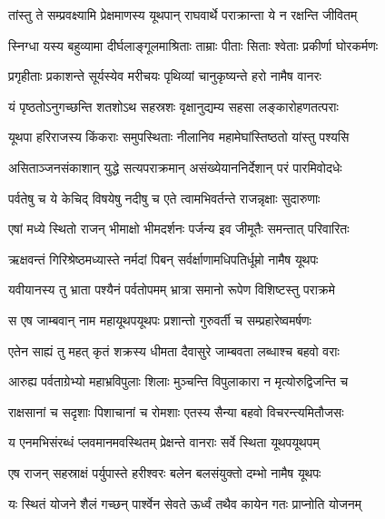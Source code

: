 
\twolineshloka
{तांस्तु ते सम्प्रवक्ष्यामि प्रेक्षमाणस्य यूथपान्}
{राघवार्थे पराक्रान्ता ये न रक्षन्ति जीवितम्} %

\twolineshloka
{स्निग्धा यस्य बहुव्यामा दीर्घलाङ्गूलमाश्रिताः}
{ताम्राः पीताः सिताः श्वेताः प्रकीर्णा घोरकर्मणः} %

\twolineshloka
{प्रगृहीताः प्रकाशन्ते सूर्यस्येव मरीचयः}
{पृथिव्यां चानुकृष्यन्ते हरो नामैष वानरः} %

\twolineshloka
{यं पृष्ठतोऽनुगच्छन्ति शतशोऽथ सहस्रशः}
{वृक्षानुद्यम्य सहसा लङ्कारोहणतत्पराः} %

\twolineshloka
{यूथपा हरिराजस्य किंकराः समुपस्थिताः}
{नीलानिव महामेघांस्तिष्ठतो यांस्तु पश्यसि} %

\twolineshloka
{असिताञ्जनसंकाशान् युद्धे सत्यपराक्रमान्}
{असंख्येयाननिर्देशान् परं पारमिवोदधेः} %

\twolineshloka
{पर्वतेषु च ये केचिद् विषयेषु नदीषु च}
{एते त्वामभिवर्तन्ते राजन्नृक्षाः सुदारुणाः} %

\twolineshloka
{एषां मध्ये स्थितो राजन् भीमाक्षो भीमदर्शनः}
{पर्जन्य इव जीमूतैः समन्तात् परिवारितः} %

\twolineshloka
{ऋक्षवन्तं गिरिश्रेष्ठमध्यास्ते नर्मदां पिबन्}
{सर्वर्क्षाणामधिपतिर्धूम्रो नामैष यूथपः} %

\twolineshloka
{यवीयानस्य तु भ्राता पश्यैनं पर्वतोपमम्}
{भ्रात्रा समानो रूपेण विशिष्टस्तु पराक्रमे} %

\twolineshloka
{स एष जाम्बवान् नाम महायूथपयूथपः}
{प्रशान्तो गुरुवर्ती च सम्प्रहारेष्वमर्षणः} %

\twolineshloka
{एतेन साह्यं तु महत् कृतं शक्रस्य धीमता}
{दैवासुरे जाम्बवता लब्धाश्च बहवो वराः} %

\twolineshloka
{आरुह्य पर्वताग्रेभ्यो महाभ्रविपुलाः शिलाः}
{मुञ्चन्ति विपुलाकारा न मृत्योरुद्विजन्ति च} %

\twolineshloka
{राक्षसानां च सदृशाः पिशाचानां च रोमशाः}
{एतस्य सैन्या बहवो विचरन्त्यमितौजसः} %

\twolineshloka
{य एनमभिसंरब्धं प्लवमानमवस्थितम्}
{प्रेक्षन्ते वानराः सर्वे स्थिता यूथपयूथपम्} %

\twolineshloka
{एष राजन् सहस्राक्षं पर्युपास्ते हरीश्वरः}
{बलेन बलसंयुक्तो दम्भो नामैष यूथपः} %

\twolineshloka
{यः स्थितं योजने शैलं गच्छन् पार्श्वेन सेवते}
{ऊर्ध्वं तथैव कायेन गतः प्राप्नोति योजनम्} %

